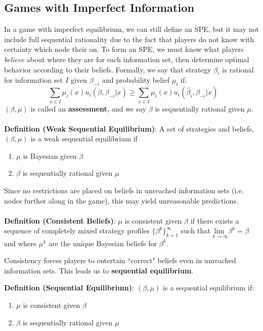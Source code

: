 \documentclass{article}
\begin{document}
\subsection{Games with Imperfect Information}
In a game with imperfect equilibrium, we can still define an SPE, but it may not include full sequential rationality due to the fact that players do not know with certainty which node their on. To form an SPE, we must know what players \textit{believe} about where they are for each information set, then determine optimal behavior according to their beliefs. Formally, we say that strategy $\beta_i$ is rational for information set $I$ given $\beta_{-i}$ and probability belief $\mu_i$ if:
\[
	\sum_{x\in I}\mu_i(x)u_i(\beta,\beta_{-i}|x)\geq\sum_{x\in I}\mu_i(x)u_i(\hat{\beta}_i,\beta_{-i}|x)
\]
$(\beta,\mu)$ is called an \textbf{assessment}, and we say $\beta$ is sequentially rational given $\mu$. \\
\\
\textbf{Definition (Weak Sequential Equilibrium)}: A set of strategies and beliefs, $(\beta,\mu)$ is a weak sequential equilibrium if
	\begin{enumerate}
		\item $\mu$ is Bayesian given $\beta$ 
		\item $\beta$ is sequentially rational given $\mu$ 
	\end{enumerate}
	Since no restrictions are placed on beliefs in unreached information sets (i.e. nodes further along in the game), this may yield unreasonable predictions. \\
	\\
\textbf{Definition (Consistent Beliefs)}: $\mu$ is consistent given $\beta$ if there exists a sequence of completely mixed strategy profiles $\{\beta^k\}_{k=1}^\infty$ such that ${\underset{k\rightarrow\infty}{\text{lim }}\beta^k=\beta}$ and where $\mu^k$ are the unique Bayesian beliefs for $\beta^k$.

Consistency forces players to entertain ``correct" beliefs even in unreached information sets. This leads us to \textbf{sequential equilibrium}.

\textbf{Definition (Sequential Equilibrium)}: $(\beta,\mu)$ is a sequential equilibrium if:
	\begin{enumerate}
		\item $\mu$ is consistent given $\beta$
		\item $\beta$ is sequentially rational given $\mu$
	\end{enumerate}
\end{document}
